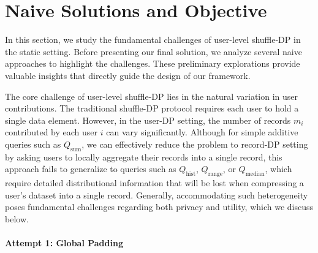 

\section{Naive Solutions and Objective}




\label{sec:Challenges and Objectives}

In this section, we study the fundamental challenges of user-level shuffle-DP in the static setting. Before presenting our final solution, we analyze several naive approaches to highlight the challenges. These preliminary explorations provide valuable insights that directly guide the design of our framework.


The core challenge of user-level shuffle-DP lies in the natural variation in user contributions. 
The traditional shuffle-DP protocol requires each user to hold a single data element.
However, in the user-DP setting, the number of records $m_i$ contributed by each user $i$ can vary significantly. 
Although for simple additive queries such as $Q_{\text{sum}}$, we can effectively reduce the problem to record-DP setting by asking users to locally aggregate their records into a single record, this approach fails to generalize to queries such as $Q_{\text{hist}}$, $Q_{\text{range}}$, or $Q_{\text{median}}$, which require detailed distributional information that will be lost when compressing a user's dataset into a single record.
Generally, accommodating such heterogeneity poses fundamental challenges regarding both privacy and utility, which we discuss below.

\paragraph{Attempt 1: Global Padding}

